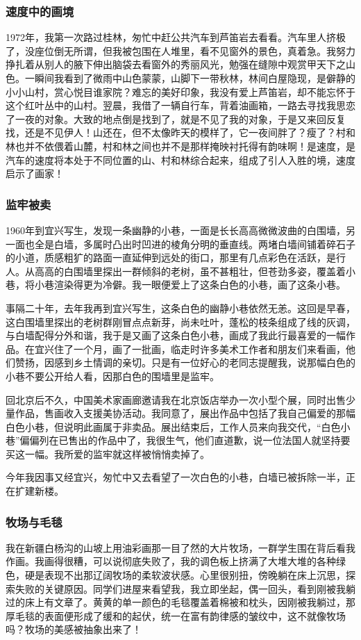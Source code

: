 \documentclass{article}
\begin{document}
\subsubsection{速度中的画境}
1972年，我第一次路过桂林，匆忙中赶公共汽车到芦笛岩去看看。汽车里人挤极了，没座位倒无所谓，但我被包围在人堆里，看不见窗外的景色，真着急。我努力挣扎着从别人的腋下伸出脑袋去看窗外的秀丽风光，勉强在缝隙中观赏甲天下之山色。一瞬间我看到了微雨中山色蒙蒙，山脚下一带秋林，林间白屋隐现，是僻静的小小山村，赏心悦目谁家院？难忘的美好印象，我没有爱上芦笛岩，却不能忘怀于这个红叶丛中的山村。翌晨，我借了一辆自行车，背着油画箱，一路去寻找我思恋了一夜的对象。大致的地点倒是找到了，就是不见了我的对象，于是又来回反复找，还是不见伊人！山还在，但不太像昨天的模样了，它一夜间胖了？瘦了？村和林也并不依偎着山麓，村和林之间也并不是那样掩映衬托得有韵味啊！是速度，是汽车的速度将本处于不同位置的山、村和林综合起来，组成了引人入胜的境，速度启示了画家！
\subsubsection{监牢被卖}
1960年到宜兴写生，发现一条幽静的小巷，一面是长长高高微微波曲的白围墙，另一面也全是白墙，多属时凸出时凹进的棱角分明的垂直线。两堵白墙间铺着碎石子的小道，质感粗犷的路面一直延伸到远处的街口，那里有几点彩色在活跃，是行人。从高高的白围墙里探出一群倾斜的老树，虽不甚粗壮，但苍劲多姿，覆盖着小巷，将小巷渲染得更为冷僻。我一眼便爱上了这条白色的小巷，画了这条小巷。

事隔二十年，去年我再到宜兴写生，这条白色的幽静小巷依然无恙。这回是早春，这白围墙里探出的老树群刚冒点点新芽，尚未吐叶，蓬松的枝条组成了线的灰调，与白墙配得分外和谐，我于是又画了这条白色小巷，画成了我此行最喜爱的一幅作品。在宜兴住了一个月，画了一批画，临走时许多美术工作者和朋友们来看画，他们赞扬，因感到乡土情调的亲切。只是有一位好心的老同志提醒我，说那幅白色的小巷不要公开给人看，因那白色的围墙里是监牢。

回北京后不久，中国美术家画廊邀请我在北京饭店举办一次小型个展，同时出售少量作品，售画收入支援美协活动。我同意了，展出作品中包括了我自己偏爱的那幅白色小巷，但说明此画属于非卖品。展出结束后，工作人员来向我交代，“白色小巷”偏偏列在已售出的作品中了，我很生气，他们直道歉，说一位法国人就坚持要买这一幅。我所爱的监牢就这样被悄悄卖掉了。

今年我因事又经宜兴，匆忙中又去看望了一次白色的小巷，白墙已被拆除一半，正在扩建新楼。
\subsubsection{牧场与毛毯}
我在新疆白杨沟的山坡上用油彩画那一目了然的大片牧场，一群学生围在背后看我作画。我画得很糟，可以说彻底失败了，我的调色板上挤满了大堆大堆的各种绿色，硬是表现不出那辽阔牧场的柔软波状感。心里很别扭，傍晚躺在床上沉思，探索失败的关键原因。同学们进屋来看望我，我立即坐起，偶一回头，看到刚被我躺过的床上有文章了。黄黄的单一颜色的毛毯覆盖着棉被和枕头，因刚被我躺过，那厚毛毯的表面便形成了缓和的起伏，统一在富有韵律感的皱纹中，这不就像牧场吗？牧场的美感被抽象出来了！
\end{document}
